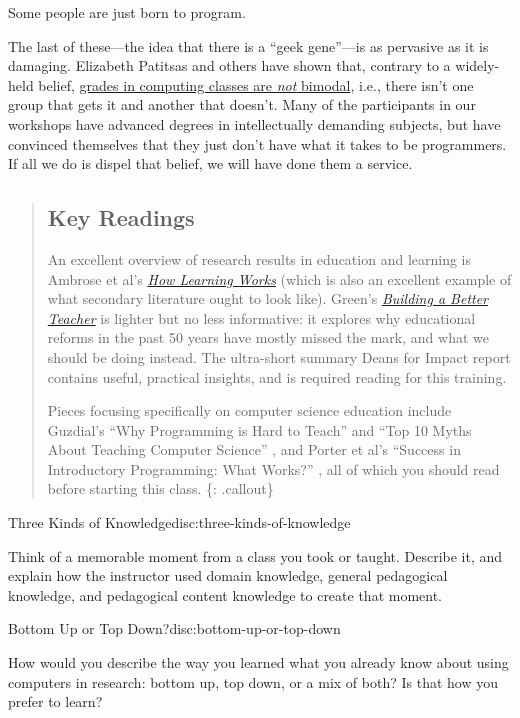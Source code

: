 Some people are just born to program.

The last of these---the idea that there is a ``geek gene''---is as
pervasive as it is damaging. Elizabeth Patitsas and others have shown
that, contrary to a widely-held belief,
\href{http://dl.acm.org/citation.cfm?id=2960312}{grades in computing
classes are \emph{not} bimodal}, i.e., there isn't one group that gets
it and another that doesn't. Many of the participants in our workshops
have advanced degrees in intellectually demanding subjects, but have
convinced themselves that they just don't have what it takes to be
programmers. If all we do is dispel that belief, we will have done them
a service.

\begin{quote}
\subsection{Key Readings}\label{key-readings}

An excellent overview of research results in education and learning is
Ambrose et al's
\emph{\href{http://www.amazon.com/How-Learning-Works-Research-Based-Jossey-Bass/dp/0470484101/}{How
Learning Works}} (which is also an excellent example of what secondary
literature ought to look like). Green's
\emph{\href{http://www.amazon.com/Building-Better-Teacher-Teaching-Everyone/dp/0393081591/}{Building
a Better Teacher}} is lighter but no less informative: it explores why
educational reforms in the past 50 years have mostly missed the mark,
and what we should be doing instead. The ultra-short summary
Deans for Impact report \cite{bib:deans-for-impact} contains useful, practical insights, and is
required reading for this training.

Pieces focusing specifically on computer science education include
Guzdial's
``Why Programming is Hard to Teach'' \cite{bib:guzdial-hard} and
``Top 10 Myths About Teaching Computer Science'' \cite{bib:guzdial-top10},
and Porter et al's ``Success in Introductory Programming: What Works?'' \cite{bib:porter-what-works},
all of which you should read before starting this class. \{: .callout\}
\end{quote}

\begin{discussion}{Three Kinds of Knowledge}{disc:three-kinds-of-knowledge}

Think of a memorable moment from a class you took or taught. Describe
it, and explain how the instructor used domain knowledge, general
pedagogical knowledge, and pedagogical content knowledge to create that
moment.
\end{discussion}

\begin{discussion}{Bottom Up or Top Down?}{disc:bottom-up-or-top-down}

How would you describe the way you learned what you already know about
using computers in research: bottom up, top down, or a mix of both? Is
that how you prefer to learn?
\end{discussion}
